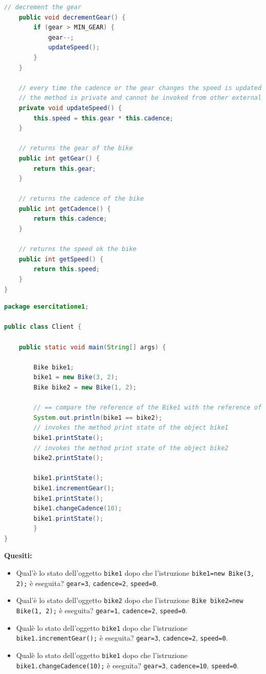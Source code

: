 \documentclass{article}
\theoremstyle{definition}
\begin{document}
\begin{lstlisting}[language=Java,escapechar=|]
	// decrement the gear
	public void decrementGear() {
		if (gear > MIN_GEAR) {
			gear--;
			updateSpeed();
		}
	}

	// every time the cadence or the gear changes the speed is updated
	// the method is private and cannot be invoked from other external classes
	private void updateSpeed() {
		this.speed = this.gear * this.cadence;
	}

	// returns the gear of the bike
	public int getGear() {
		return this.gear;
	}

	// returns the cadence of the bike
	public int getCadence() {
		return this.cadence;
	}

	// returns the speed ok the bike
	public int getSpeed() {
		return this.speed;
	}
}
\end{lstlisting}

\begin{lstlisting}[language=Java,escapechar=|]
package esercitatione1;

public class Client {

	public static void main(String[] args) {

		Bike bike1;
		bike1 = new Bike(3, 2);
		Bike bike2 = new Bike(1, 2);

		// == compare the reference of the Bike1 with the reference of the Bike2
		System.out.println(bike1 == bike2);
		// invokes the method print state of the object bike1
		bike1.printState();
		// invokes the method print state of the object bike2
		bike2.printState();

		bike1.printState();
		bike1.incrementGear();
		bike1.printState();
		bike1.changeCadence(10);
		bike1.printState();
	    }
}
\end{lstlisting}
\textbf{Quesiti:}\\
\begin{itemize}
\item Qual'\`e lo stato dell'oggetto \texttt{bike1} dopo che l'istruzione   \texttt{bike1=new Bike(3, 2);} \`e eseguita? 
\texttt{gear=3}, \texttt{cadence=2}, \texttt{speed=0}.
\item Qual'\`e lo stato dell'oggetto  \texttt{bike2} dopo che l'istruzione  \texttt{Bike bike2=new Bike(1, 2);} \`e eseguita? 
\texttt{gear=1}, \texttt{cadence=2}, \texttt{speed=0}.
\item Qual\`e lo stato dell'oggetto \texttt{bike1} dopo che l'istruzione \texttt{bike1.incrementGear();} \`e eseguita? 
\texttt{gear=3}, \texttt{cadence=2}, \texttt{speed=0}.
\item Qual\`e lo stato dell'oggetto \texttt{bike1} dopo che l'istruzione   \texttt{bike1.changeCadence(10);} \`e eseguita? 
\texttt{gear=3}, \texttt{cadence=10}, \texttt{speed=0}.
\end{itemize}
\end{document}
